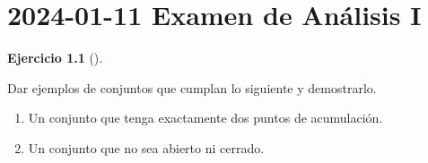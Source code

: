 \documentclass[
  a4paper,
]{scrreport}
\providecommand{\tightlist}{%
  \setlength{\itemsep}{0pt}\setlength{\parskip}{0pt}}\usepackage{longtable,booktabs,array}
\theoremstyle{definition}
\newtheorem{exercise}{Ejercicio}[chapter]
\theoremstyle{remark}
\begin{document}

\chapter{\texorpdfstring{2024-01-11 Examen de Análisis
I}{2024-01-11  Examen de Análisis I}}\label{examen-de-anuxe1lisis-i-3}

\begin{exercise}[]\protect\hypertarget{exr-1}{}\label{exr-1}

Dar ejemplos de conjuntos que cumplan lo siguiente y demostrarlo.

\begin{enumerate}
\def\labelenumi{\alph{enumi}.}
\tightlist
\item
  Un conjunto que tenga exactamente dos puntos de acumulación.
\item
  Un conjunto que no sea abierto ni cerrado.
\end{enumerate}

\end{exercise}
\end{document}

